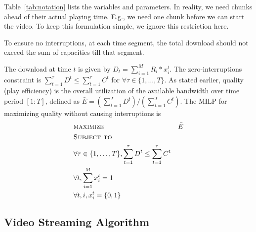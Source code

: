 Table~\ref{tab:notation} lists the variables and parameters.
In reality, we need chunks ahead of their actual playing
time. E.g., we need one chunk before we can start the video. To keep
this formulation simple, we ignore this restriction here.

To ensure  no interruptions, at each time segment, the total download
should not exceed the sum of capacities till that segment.



The download at time $t$ is given by 
$D_t = \sum \limits_{i=1}^M R_i *  x_i^t$. 
The zero-interruptions constraint is 
$\sum \limits_{t=1}^\tau D^t\leq\sum\limits_{t=1}^\tau C^t$
for $\forall \tau \in \{1, \dots, T\}$.
As stated earlier, 
quality (play efficiency) 
is the overall utilization of the available bandwidth
over time period $[1:T]$, defined as
$\bar{E}=(\sum\limits_{t=1}^T D^t)/(\sum\limits_{t=1}^T C^t)$. 
The MILP for maximizing quality without causing interruptions is
\begin{subequations}
\begin{align*}
&\textsc{maximize }&\bar{E}\\ 
&\textsc{Subject to}\\
&\forall \tau \in \{1, \dots, T\}, \sum \limits_{t=1}^\tau  D^t
\leq\sum\limits_{t=1}^\tau C^t \\
& \forall t, \sum \limits_{i=1}^M x_i^t =1\ \\
& \forall t, i, x_i^t = \{0,1\}
\end{align*}
\end{subequations}

\subsection{Video Streaming Algorithm} \label{subsec:online}

